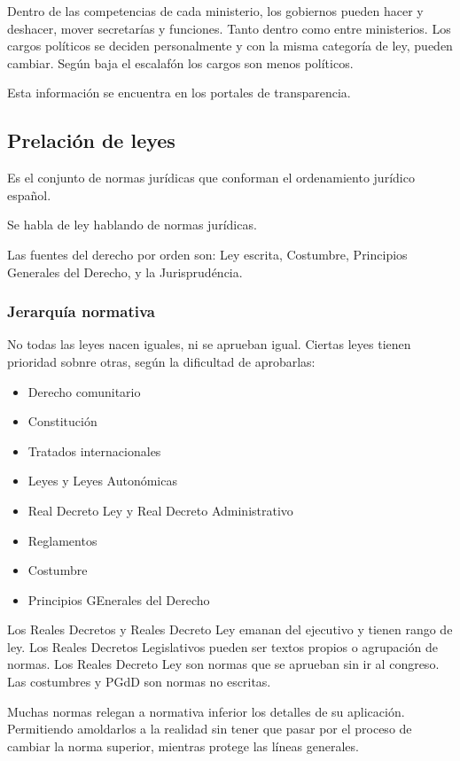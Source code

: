     Dentro de las competencias de cada ministerio, los gobiernos pueden hacer y deshacer, mover secretarías y funciones. Tanto dentro como entre ministerios. Los cargos políticos se deciden personalmente y con la misma categoría de ley, pueden cambiar. Según baja el escalafón los cargos son menos políticos.

    Esta información se encuentra en los portales de transparencia.

\subsection{Prelación de leyes}

    Es el conjunto de normas jurídicas que conforman el ordenamiento jurídico español.

    Se habla de ley hablando de normas jurídicas.

    Las fuentes del derecho por orden son: Ley escrita, Costumbre, Principios Generales del Derecho, y la Jurisprudéncia.

\subsubsection{Jerarquía normativa}

    No todas las leyes nacen iguales, ni se aprueban igual. Ciertas leyes tienen prioridad sobnre otras, según la dificultad de aprobarlas:

    \begin{itemize}
        \item Derecho comunitario
        \item Constitución
        \item Tratados internacionales
        \item Leyes y Leyes Autonómicas
        \item Real Decreto Ley y Real Decreto Administrativo
        \item Reglamentos
        \item Costumbre
        \item Principios GEnerales del Derecho
    \end{itemize}

    Los Reales Decretos y Reales Decreto Ley emanan del ejecutivo y tienen rango de ley. Los Reales Decretos Legislativos pueden ser textos propios o agrupación de normas. Los Reales Decreto Ley son normas que se aprueban sin ir al congreso. Las costumbres y PGdD son normas no escritas.

    Muchas normas relegan a normativa inferior los detalles de su aplicación. Permitiendo amoldarlos a la realidad sin tener que pasar por el proceso de cambiar la norma superior, mientras protege las líneas generales.

